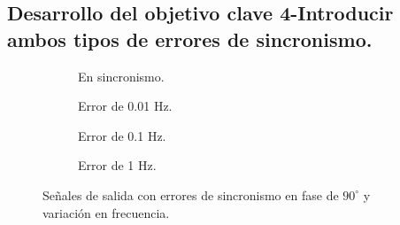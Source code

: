 \subsection{Desarrollo del objetivo clave 4-Introducir ambos tipos de errores de sincronismo.}


\begin{figure}[H]
	\centering
	\begin{subfigure}[b]{0.49\linewidth}
		\def\svgwidth{5cm}
		
		\caption{\scriptsize En sincronismo.}
		\label{subfig:EMF90_freq0}
	\end{subfigure}
	\begin{subfigure}[b]{0.49\linewidth}
		\def\svgwidth{5cm}
		
		\caption{\scriptsize Error de 0.01 Hz.}
		\label{subfig:EMF90_freq001}
	\end{subfigure}
	\begin{subfigure}[b]{0.49\linewidth}
		\def\svgwidth{5cm}
		
		\caption{\scriptsize Error de 0.1 Hz.}
		\label{subfig:EMF90_freq01}
	\end{subfigure}
	\begin{subfigure}[b]{0.49\linewidth}
		\def\svgwidth{5cm}
		
		\caption{\scriptsize Error de 1 Hz.}
		\label{subfig:EMF90_freq1}
	\end{subfigure}
	\vspace{-3mm}
	\caption{\scriptsize Señales de salida con errores de sincronismo en fase de $90^\circ$ y variación en frecuencia.}
	\label{fig:graficasFase90freq}
	\vspace{-5mm}
\end{figure}
